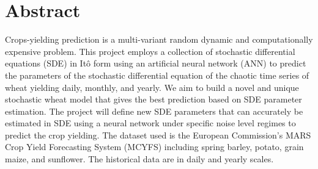 \section*{Abstract}
Crops-yielding prediction is a multi-variant random dynamic and computationally expensive problem. 
This project employs a collection of stochastic differential equations (SDE) in Itô form using an artificial neural network (ANN)
to predict the parameters of the stochastic differential equation of the chaotic time series of wheat yielding daily, monthly,
and yearly. We aim to build a novel and unique stochastic wheat model that gives the best prediction based on SDE parameter 
estimation. The project will define new SDE parameters that can accurately be estimated in SDE using a neural network under 
specific noise level regimes to predict the crop yielding. The dataset used is the European Commission’s MARS Crop Yield 
Forecasting System (MCYFS) including spring barley, potato, grain maize, and sunflower. The historical data are in daily 
and yearly scales.
